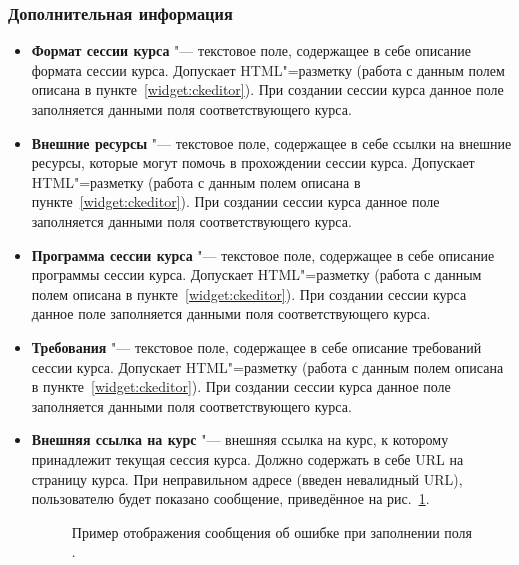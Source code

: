 \subsubsection{Дополнительная информация}
	\begin{itemize}
		\item \textbf{Формат сессии курса} "--- текстовое поле, содержащее в себе описание формата сессии курса. Допускает HTML"=разметку (работа с данным полем описана в пункте~\ref{widget:ckeditor}).
		При создании сессии курса данное поле заполняется данными поля  соответствующего курса.
		
		\item \textbf{Внешние ресурсы} "--- текстовое поле, содержащее в себе ссылки на внешние ресурсы, которые могут помочь в прохождении сессии курса. Допускает HTML"=разметку (работа с данным полем описана в пункте~\ref{widget:ckeditor}). При создании сессии курса данное поле заполняется данными поля  соответствующего курса.
		
		\item \textbf{Программа сессии курса} "--- текстовое поле, содержащее в себе описание программы сессии курса. Допускает HTML"=разметку (работа с данным полем описана в пункте~\ref{widget:ckeditor}). При создании сессии курса данное поле заполняется данными поля  соответствующего курса.
		
		\item \textbf{Требования} "--- текстовое поле, содержащее в себе описание требований сессии курса. Допускает HTML"=разметку (работа с данным полем описана в пункте~\ref{widget:ckeditor}). При создании сессии курса данное поле заполняется данными поля  соответствующего курса.
		
		\item \textbf{Внешняя ссылка на курс} "--- внешняя ссылка на курс, к которому принадлежит текущая сессия курса. Должно содержать в себе URL на страницу курса. При неправильном адресе (введен невалидный URL), пользователю будет показано сообщение, приведённое на рис.~\ref{img:course_session:url-error}.
		\begin{figure}[H]
			\caption{Пример отображения сообщения об ошибке при заполнении поля .}
			\label{img:course_session:url-error}
		\end{figure}
		

\end{itemize}
